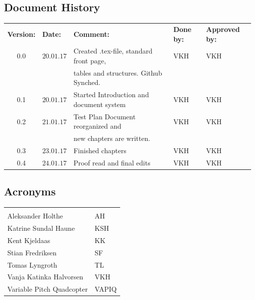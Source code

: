 \documentclass{article}
\begin{document}
\begin{center}
\section*{\textbf{Document History}}
\begin{tabular}{cllll}
\rowcolor{cadetgrey}
\textbf{Version:}    &\textbf{Date:} 	 &\textbf{Comment:}    &\textbf{Done by:}   &\textbf{Approved by:}  \\

0.0       & $20.01.17$   & Created .tex-file, standard front page, & VKH  & VKH\\
          &              & tables and structures. Github Synched.    &     & \\\rowcolor{gainsboro}
0.1       & $20.01.17$   & Started Introduction and document system  & VKH    & VKH\\
0.2       & $21.01.17$   & Test Plan Document reorganized and  & VKH    & VKH          \\ 
          &              & new chapters are written.          &     &          \\ \rowcolor{gainsboro}
0.3       & $23.01.17$   & Finished chapters  & VKH   & VKH\\
0.4       & $24.01.17$   & Proof read and final edits & VKH  & VKH\\
\end{tabular}                                                                   
\end{center}
\vspace*{3.0 cm}

\begin{center}
\section*{\textbf{Acronyms}}
\begin{tabular}{ll}
\rowcolor{cadetgrey}
    &   \\
Aleksander Holthe      & AH     
 \\\rowcolor{gainsboro}
Katrine Sundal Haune  & KSH \\
Kent Kjeldaas         & KK 
 \\\rowcolor{gainsboro}
Stian Fredriksen      & SF  \\
Tomas Lyngroth       & TL   
 \\\rowcolor{gainsboro}
Vanja Katinka Halvorsen     & VKH   \\
Variable Pitch Quadcopter   & VAPIQ
\end{tabular}                                                             
\end{center}
\end{document}
